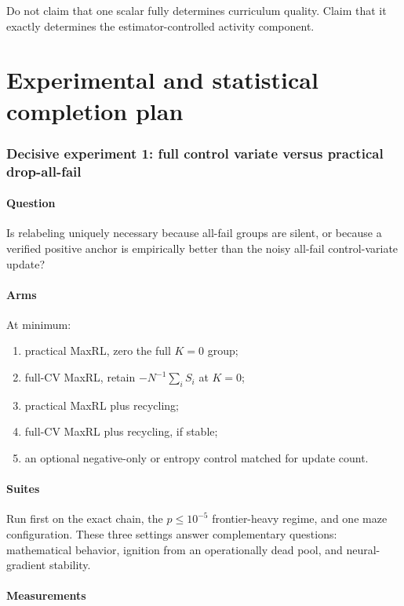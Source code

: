 \documentclass[11pt]{article}
\theoremstyle{definition}
\theoremstyle{remark}
\begin{document}
Do not claim that one scalar fully determines curriculum quality. Claim that it exactly determines the estimator-controlled activity component.

\part{Experimental and statistical completion plan}

\section{Decisive experiment 1: full control variate versus practical drop-all-fail}

\subsection{Question}

Is relabeling uniquely necessary because all-fail groups are silent, or because a verified positive anchor is empirically better than the noisy all-fail control-variate update?

\subsection{Arms}

At minimum:

\begin{enumerate}[leftmargin=2em]
\item practical MaxRL, zero the full $K=0$ group;
\item full-CV MaxRL, retain $-N^{-1}\sum_iS_i$ at $K=0$;
\item practical MaxRL plus recycling;
\item full-CV MaxRL plus recycling, if stable;
\item an optional negative-only or entropy control matched for update count.
\end{enumerate}

\subsection{Suites}

Run first on the exact chain, the $p\le10^{-5}$ frontier-heavy regime, and one maze configuration. These three settings answer complementary questions: mathematical behavior, ignition from an operationally dead pool, and neural-gradient stability.

\subsection{Measurements}
\end{document}
